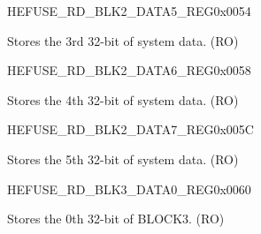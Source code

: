 \begin{register}{H}{EFUSE\_RD\_BLK2\_DATA5\_REG}{0x0054}\label{regdesc:EFUSERDBLK2DATA5REG}
%
\regnewline%
\begin{regdesc}\begin{reglist}
\label{fielddesc:EFUSESYSDATA4}\item [EFUSE\_SYS\_DATA4] Stores the 3rd 32-bit of system data. (RO)
\end{reglist}\end{regdesc}
\end{register}


\begin{register}{H}{EFUSE\_RD\_BLK2\_DATA6\_REG}{0x0058}\label{regdesc:EFUSERDBLK2DATA6REG}
%
\regnewline%
\begin{regdesc}\begin{reglist}
\label{fielddesc:EFUSESYSDATA5}\item [EFUSE\_SYS\_DATA5] Stores the 4th 32-bit of system data. (RO)
\end{reglist}\end{regdesc}
\end{register}


\begin{register}{H}{EFUSE\_RD\_BLK2\_DATA7\_REG}{0x005C}\label{regdesc:EFUSERDBLK2DATA7REG}
%
\regnewline%
\begin{regdesc}\begin{reglist}
\label{fielddesc:EFUSESYSDATA6}\item [EFUSE\_SYS\_DATA6] Stores the 5th 32-bit of system data. (RO)
\end{reglist}\end{regdesc}
\end{register}


\begin{register}{H}{EFUSE\_RD\_BLK3\_DATA0\_REG}{0x0060}\label{regdesc:EFUSERDBLK3DATA0REG}
%
\regnewline%
\begin{regdesc}\begin{reglist}
\label{fielddesc:EFUSEBLK3DATA0}\item [EFUSE\_BLK3\_DATA0] Stores the 0th 32-bit of BLOCK3. (RO)
\end{reglist}\end{regdesc}
\end{register}


